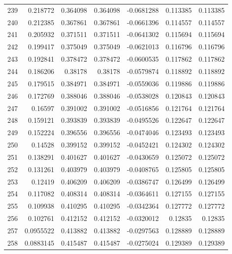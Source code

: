 \begin{tabular}{rrrrrrr}
 239 &  0.218772    & 0.364098    & 0.364098    & -0.0681288   & 0.113385    & 0.113385    \\
 240 &  0.212385    & 0.367861    & 0.367861    & -0.0661396   & 0.114557    & 0.114557    \\
 241 &  0.205932    & 0.371511    & 0.371511    & -0.0641302   & 0.115694    & 0.115694    \\
 242 &  0.199417    & 0.375049    & 0.375049    & -0.0621013   & 0.116796    & 0.116796    \\
 243 &  0.192841    & 0.378472    & 0.378472    & -0.0600535   & 0.117862    & 0.117862    \\
 244 &  0.186206    & 0.38178     & 0.38178     & -0.0579874   & 0.118892    & 0.118892    \\
 245 &  0.179515    & 0.384971    & 0.384971    & -0.0559036   & 0.119886    & 0.119886    \\
 246 &  0.172769    & 0.388046    & 0.388046    & -0.0538028   & 0.120843    & 0.120843    \\
 247 &  0.16597     & 0.391002    & 0.391002    & -0.0516856   & 0.121764    & 0.121764    \\
 248 &  0.159121    & 0.393839    & 0.393839    & -0.0495526   & 0.122647    & 0.122647    \\
 249 &  0.152224    & 0.396556    & 0.396556    & -0.0474046   & 0.123493    & 0.123493    \\
 250 &  0.14528     & 0.399152    & 0.399152    & -0.0452421   & 0.124302    & 0.124302    \\
 251 &  0.138291    & 0.401627    & 0.401627    & -0.0430659   & 0.125072    & 0.125072    \\
 252 &  0.131261    & 0.403979    & 0.403979    & -0.0408765   & 0.125805    & 0.125805    \\
 253 &  0.12419     & 0.406209    & 0.406209    & -0.0386747   & 0.126499    & 0.126499    \\
 254 &  0.117082    & 0.408314    & 0.408314    & -0.0364611   & 0.127155    & 0.127155    \\
 255 &  0.109938    & 0.410295    & 0.410295    & -0.0342364   & 0.127772    & 0.127772    \\
 256 &  0.102761    & 0.412152    & 0.412152    & -0.0320012   & 0.12835     & 0.12835     \\
 257 &  0.0955522   & 0.413882    & 0.413882    & -0.0297563   & 0.128889    & 0.128889    \\
 258 &  0.0883145   & 0.415487    & 0.415487    & -0.0275024   & 0.129389    & 0.129389    \\

\end{tabular}

